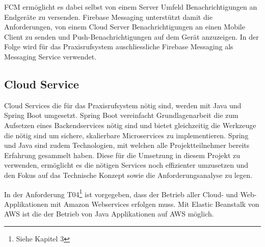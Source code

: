 FCM ermöglicht es dabei selbst von einem Server Umfeld Benachrichtigungen an Endgeräte zu versenden.\cite{fcm-java}
Firebase Messaging unterstützt damit die Anforderungen, von einem Cloud Server Benachrichtigungen an einen Mobile Client zu senden und Push-Benachrichtigungen auf dem Gerät anzuzeigen.
In der Folge wird für das Praxisrufsystem auschliessliche Firebase Messaging als Messaging Service verwendet.

\subsection{Cloud Service}\label{subsec:cloud-service2}

Cloud Services die für das Praxisrufsystem nötig sind, werden mit Java und Spring Boot umgesetzt.
Spring Boot vereinfacht Grundlagenarbeit die zum Aufsetzen eines Backendservices nötig sind und bietet
gleichzeitig die Werkzeuge die nötig sind um sichere, skalierbare Microservices zu implementieren.\cite{why-spring}
Spring und Java sind zudem Technologien, mit welchen alle Projektteilnehmer bereits Erfahrung gesammelt haben.
Diese für die Umsetzung in diesem Projekt zu verwenden, ermöglicht es die nötigen Services noch effizienter umzusetzen
und den Fokus auf das Technische Konzept sowie die Anforderungsanalyse zu legen.

In der Anforderung T04\footnote{Siehe Kapitel 3} ist vorgegeben, dass der Betrieb aller Cloud- und Web-Applikationen mit Amazon Webservices erfolgen muss.
Mit Elastic Beanstalk von AWS ist die der Betrieb von Java Applikationen auf AWS möglich.\cite{aws-spring-java}


